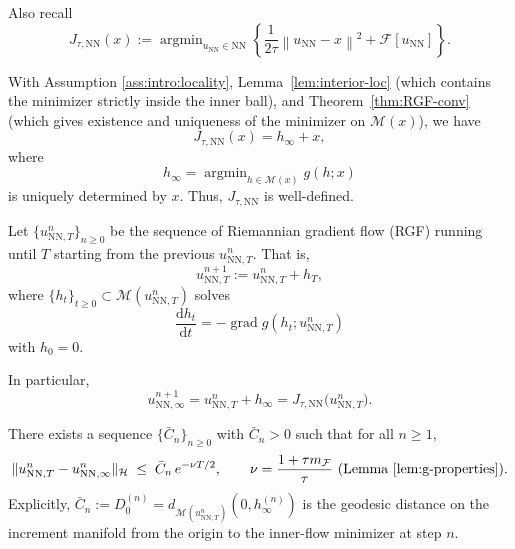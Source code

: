 \documentclass[twoside,11pt]{article}
\newcommand{\nm}[1]{\left\lVert#1\right\rVert}
\newcommand{\ud}{\mathrm{d}}
\newcommand{\grad}{\operatorname{grad} }
\newcommand{\NN}{\mathrm{NN}}
\newcommand{\argmin}{\mathop{\mathrm{arg min}}}
\newcommand{\calF}{\mathcal{F}}
\newcommand{\calH}{\mathcal{H}}
\newcommand{\calM}{\mathcal{M}}
\begin{document}
Also recall 
\begin{equation}
    J_{\tau,\NN}(x) := \argmin_{u_\NN \in \NN} \left\{\frac{1}{2\tau}\nm{u_\NN -x}^2 + \mathcal{F}[u_\NN]\right\}. 
\end{equation}

With Assumption \ref{ass:intro:locality}, Lemma~\ref{lem:interior-loc} (which contains the minimizer strictly inside the inner ball), and Theorem~\ref{thm:RGF-conv} (which gives existence and uniqueness of the minimizer on $\calM(x)$), we have
\begin{equation}\label{eq:J-tau-NN-well-defined}
J_{\tau,\NN}(x) =  h_\infty + x,
\end{equation}
where 
\[
h_\infty = \argmin_{h \in \mathcal{M}(x)} g(h;x) 
\]
is uniquely determined by $x$.  Thus, $J_{\tau, \NN}$ is well-defined. 

Let $\{u^n_{\NN,T}\}_{n\geq 0}$ be the sequence of Riemannian gradient flow (RGF) running until $T$ starting from the previous $u_{\NN,T}^n$. That is, 
\begin{equation}\label{eqn:RGF-update}
    u^{n+1}_{\NN,T} := u^n_{\NN,T} + h_T,
\end{equation}
where $\{h_t\}_{t\geq 0 } \subset \mathcal{M}(u^n_{\NN,T})$ solves
\[
\frac{\ud h_t}{\ud t} = - \grad g(h_t; u^n_{\NN,T}) 
\]
with $h_0 = 0$. 

In particular, 
\begin{equation}\label{eq:u_infty_def}
u^{n+1}_{\NN,\infty} = u^n_{\NN,T} + h _\infty = J_{\tau,\NN}\big(u^n_{\NN,T}\big).
\end{equation}


\begin{corollary}\label{cor:rgf-finite-time}
There exists a sequence $\{\bar C_n\}_{n\ge 0}$ with $\bar C_n>0$ such that for all $n\ge 1$,
\begin{equation}\label{eq:rgf_exp}
\|u^{n}_{\NN,T}-u^{n}_{\NN,\infty}\|_\calH \;\le\; \bar C_n\, e^{-\nu T/2},
\qquad
\nu=\frac{1+\tau m_\calF}{\tau} \ \text{(Lemma~\ref{lem:g-properties})}.
\end{equation}
Explicitly, $\bar C_n := D_0^{(n)}=d_{\calM(u^n_{\NN,T})}(0,h_\infty^{(n)})$ is the geodesic distance on the increment manifold from the origin to the inner-flow minimizer at step $n$.
\end{corollary}
\end{document}
